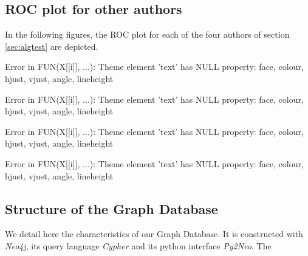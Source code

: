 \documentclass{article}\usepackage[]{graphicx}\usepackage[]{color}
\begin{document}
\subsection{\label{ssec:app:roc}ROC plot for other authors}
In the following figures, the ROC plot for each of the four authors of section {\ref{sec:algtest}} are depicted.
\begin{Schunk}
\begin{Soutput}
Error in FUN(X[[i]], ...): Theme element 'text' has NULL property: face, colour, hjust, vjust, angle, lineheight
\end{Soutput}
\end{Schunk}
\FloatBarrier
\begin{Schunk}
\begin{Soutput}
Error in FUN(X[[i]], ...): Theme element 'text' has NULL property: face, colour, hjust, vjust, angle, lineheight
\end{Soutput}
\end{Schunk}
\begin{Schunk}
\begin{Soutput}
Error in FUN(X[[i]], ...): Theme element 'text' has NULL property: face, colour, hjust, vjust, angle, lineheight
\end{Soutput}
\end{Schunk}
\begin{Schunk}
\begin{Soutput}
Error in FUN(X[[i]], ...): Theme element 'text' has NULL property: face, colour, hjust, vjust, angle, lineheight
\end{Soutput}
\end{Schunk}
\FloatBarrier
\subsection{\label{ssec:app:neo4jstruct}Structure of the Graph Database}
We detail here the characteristics of our Graph Database. It is constructed with {\it Neo4j}, its query language {\it Cypher} and its python interface {\it Py2Neo}. The 
\end{document}
